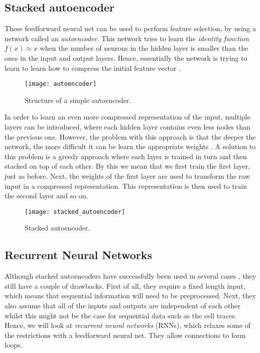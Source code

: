 \subsection{Stacked autoencoder}

These feedforward neural net can be used to perform feature selection, by using a network called an \textit{autoencoder}.
This network tries to learn the \textit{identity function} $f(x) \approx x$ when the number of neurons in the hidden layer is smaller than the ones in the input and output layers.
Hence, essentially the network is trying to learn to learn how to compress the initial feature vector \cite{autoencoders}.

\begin{figure}[ht]
  \centering
  \texttt{[image: autoencoder]}
  \caption{Structure of a simple autoencoder.}
  \label{fig:autoencoder}
\end{figure}

In order to learn an even more compressed representation of the input, multiple layers can be introduced, where each hidden layer contains even less nodes than the previous one.
However, the problem with this approach is that the deeper the network, the more difficult it can be learn the appropriate weights \cite{nielsen_2017}.
A solution to this problem is a greedy approach where each layer is trained in turn and then stacked on top of each other.
By this we mean that we first train the first layer, just as before.
Next, the weights of the first layer are used to transform the raw input in a compressed representation.
This representation is then used to train the second layer and so on.

\begin{figure}[ht]
  \centering
  \texttt{[image: stacked\_autoencoder]}
  \caption{Stacked autoencoder.}
  \label{fig:stacked-autoencoder}
\end{figure}

\newpage

\subsection{Recurrent Neural Networks}

Although stacked autoencoders have successfully been used in several cases \cite{deeplearningthesis,deeplearning2}, they still have a couple of drawbacks.
First of all, they require a fixed length input, which means that sequential information will need to be preprocessed.
Next, they also assume that all of the inputs and outputs are independent of each other \cite{britz_2016} whilst this might not be the case for sequential data such as the cell traces.
Hence, we will look at \textit{recurrent neural networks} (RNNs), which relaxes some of the restrictions with a feedforward neural net.
They allow connections to form loops.

